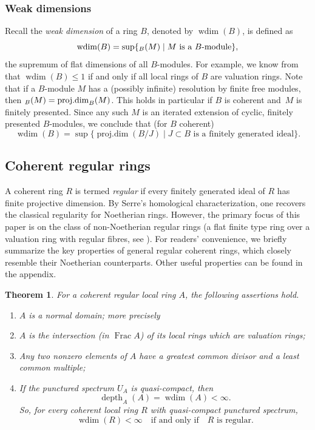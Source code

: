 \documentclass[JEP,XML,SOM,Unicode,published]{cedram}
\newenvironment{enumeratei}
{\bgroup\def\theenumi{\roman{enumi}}\def\theenumii{\arabic{enumii}}\begin{enumerate}}
{\end{enumerate}\egroup}
\newcommand{\NoChangel}[1]{%
\expandafter\let\csname old\string#1\endcsname=#1
\let#1=\relax
\newcommand{#1}{\mathop{\mathcode`l="716C\csname old\string#1\endcsname\mathcode`l="7160}\nolimits}%
}
\let\x\text
\let\q\quad
\DeclareMathOperator{\fldim}{fl.dim}\NoChangel{\fldim}
\DeclareMathOperator{\wdim}{wdim}
\DeclareMathOperator{\pd}{proj.dim}
\DeclareMathOperator{\Frac}{Frac}
\DeclareMathOperator{\depth}{depth}
\newcommand{\bthm}{\begin{thm}}
\newcommand{\ethm}{\end{thm}}
\newcommand{\benumr}{\begin{enumeratei}}
\newcommand{\eenumr}{\end{enumeratei}}
\providecommand{\SP}[1]{\cite[\href{https://stacks.math.columbia.edu/tag/#1}{#1}]{SP}}
\theoremstyle{plain}
\newtheorem{thm}[subsection]{Theorem}
\theoremstyle{definition}
\begin{document}
\subsubsection{Weak dimensions}\label{par-Weak dimesions}
Recall the \emph{weak dimension} of a ring $B$, denoted by $\wdim(B)$, is defined as
\[
\wdim(B)=\sup\{\fldim_B(M)\mid \x{$M$ is a $B$\nobreakdash-mod\-ule}\},
\]
the supremum of flat dimensions of all $B$\nobreakdash-mod\-ules.
For example, we know from \SP{092S} that $\wdim(B)\le 1$ if and only if all local rings of $B$ are valuation rings. {Note that if a $B$\nobreakdash-mod\-ule $M$ has a (possibly infinite) resolution by finite free modules, then $\fldim_{B}(M)=\pd_B(M)$. This holds in particular if $B$ is coherent and~$M$ is finitely presented. Since any such $M$ is an iterated extension of cyclic, finitely presented $B$\nobreakdash-mod\-ules, we conclude that (for $B$ coherent)
\[
\wdim(B)=\sup\{\pd(B/J)\mid \x{$J\subset B$ is a finitely generated ideal}\}.
\]}

\subsection{Coherent regular rings}\label{reg-coh}
A coherent ring $R$ is termed \emph{regular} if every finitely generated ideal of $R$ has finite projective dimension. By Serre's homological characterization, one recovers the classical regularity for Noetherian rings. However, the primary focus of this paper is on the class of non-Noetherian regular rings (\eg a flat finite type ring over a valuation ring with regular fibres, see ). For readers' convenience, we briefly summarize the key properties of general regular coherent rings, which closely resemble their Noetherian counterparts. Other useful properties can be found in the appendix.

\bthm \label{ring property coh reg}
For a coherent regular local ring $A$, the following assertions hold.
\benumr
\item\label{ring property coh reg-i} $A$ is a normal domain; more precisely
\item\label{ring property coh reg-ii} $A$ is the intersection (in $\Frac A$) of its local rings which are valuation rings;
\item\label{ring property coh reg-iii} Any two nonzero elements of $A$ have a greatest common divisor and a least common multiple;
\item\label{qc coh reg has fin wdim} If the punctured spectrum $U_A$ is quasi-compact, then
\[
\depth_A(A)=\wdim(A)<\infty.
\]
So, for every coherent local ring $R$ with quasi-compact punctured spectrum,
\[
\wdim(R)< \infty \q \x{if and only if}\q \x{$R$ is regular.}
\]
\eenumr
\ethm
\end{document}
